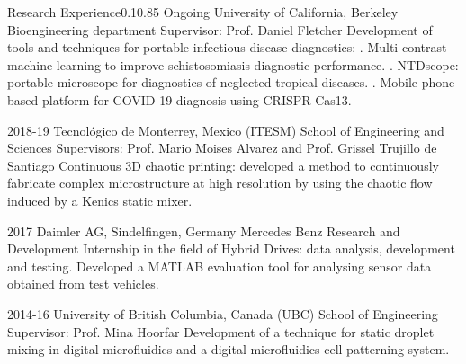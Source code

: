 \documentclass{federico_cv}
\begin{document}
\begin{tblSection}{Research Experience}{0.1}{0.85}
\job
{Ongoing}
{University of California, Berkeley}
{Bioengineering department}
{Supervisor: Prof. Daniel Fletcher}
{Development of tools and techniques for portable infectious disease diagnostics:}
{. Multi-contrast machine learning to improve schistosomiasis diagnostic performance.}
{. NTDscope: portable microscope for diagnostics of neglected tropical diseases.}
{. Mobile phone-based platform for COVID-19 diagnosis using CRISPR-Cas13.}

\job
{2018-19}
{Tecnológico de Monterrey, Mexico (ITESM)}
{School of Engineering and Sciences}
{Supervisors: Prof. Mario Moises Alvarez and Prof. Grissel Trujillo de Santiago}
{Continuous 3D chaotic printing: developed a method to continuously fabricate complex microstructure at high resolution by using the chaotic flow induced by a Kenics static mixer.}

\job
{2017}
{Daimler AG, Sindelfingen, Germany}
{Mercedes Benz Research and Development}
{Internship in the field of Hybrid Drives: data analysis, development and testing. Developed a MATLAB evaluation tool for analysing sensor data obtained from test vehicles.}

\job
{2014-16}
{University of British Columbia, Canada (UBC)}
{School of Engineering}
{Supervisor: Prof. Mina Hoorfar}
{Development of a technique for static droplet mixing in digital microfluidics and a digital microfluidics cell-patterning system.}

\end{tblSection}
\let\thefootnote\relax{}\nocite{*}
\printbibliography[keyword={Publications},title={Publications},resetnumbers=true]
\printbibliography[keyword={Patents},title={Patents},resetnumbers=true]
\end{document}
